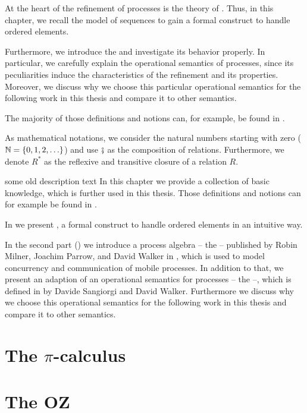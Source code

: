 At the heart of the refinement of \findex{\picalc{}} processes is the theory of . Thus, in this chapter, we recall the model of sequences to gain a formal construct to handle ordered elements.%

Furthermore, we introduce the \picalc{} and investigate its behavior properly. In particular, we carefully explain the operational semantics of \picalc{} processes, since its peculiarities induce the characteristics of the refinement and its properties. Moreover, we discuss why we choose this particular operational semantics for the following work in this thesis and compare it to other semantics.

The majority of those definitions and notions can, for example, be found in \cite{milner,sangiorgi,meyer,caires}.

As mathematical notations, we consider the natural numbers starting with zero ($\N=\set{0,1,2,\ldots}$) and use $\fatsemi$ as the composition of relations. Furthermore, we denote $R^*$ as the reflexive and transitive closure of a relation $R$.
\begin{old}{some old description text}
In this chapter we provide a collection of basic knowledge, which is further used in this thesis. Those definitions and notions can for example be found in \cite{milner,sangiorgi,meyer,caires}.

In  we present , a formal construct to handle ordered elements in an intuitive way.

In the second part () we introduce a process algebra -- the \findex{\picalc{}} -- published by Robin Milner, Joachim Parrow, and David Walker in \cite{milnerParrowWalker}, which is used to model concurrency and communication of mobile processes. In addition to that, we present an adaption of an operational semantics for \picalc{} processes -- the  --, which is defined in \cite{sangiorgi} by Davide Sangiorgi and David Walker. Furthermore we discuss why we choose this operational semantics for the following work in this thesis and compare it to other semantics.
\end{old}


\section{The \texorpdfstring{$\pi$}{pi}-calculus}
\label{sec_pi_calculus}


\section{The OZ}
\label{sec_oz}



